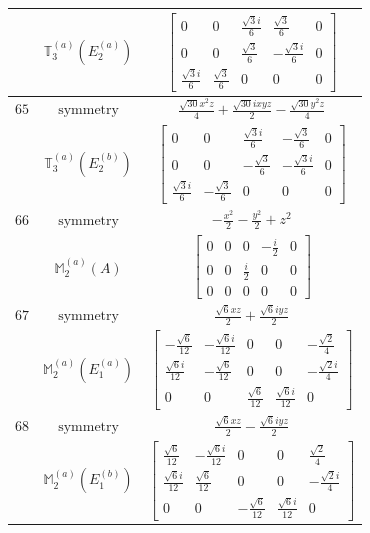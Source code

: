 \documentclass[fleqn,8pt,landscape]{jsarticle}
\begin{document}
\begin{longtable}{ccc}
$  $ & $ \mathbb{T}_{3}^{(a)}(E_{2}^{(a)}) $ & $ \begin{bmatrix} 0 & 0 & \frac{\sqrt{3} i}{6} & \frac{\sqrt{3}}{6} & 0 \\ 0 & 0 & \frac{\sqrt{3}}{6} & - \frac{\sqrt{3} i}{6} & 0 \\ \frac{\sqrt{3} i}{6} & \frac{\sqrt{3}}{6} & 0 & 0 & 0 \end{bmatrix} $ \\ \hline
$ 65 $ & $ \text{symmetry} $ & $ \frac{\sqrt{30} x^{2} z}{4} + \frac{\sqrt{30} i x y z}{2} - \frac{\sqrt{30} y^{2} z}{4} $ \\
$  $ & $ \mathbb{T}_{3}^{(a)}(E_{2}^{(b)}) $ & $ \begin{bmatrix} 0 & 0 & \frac{\sqrt{3} i}{6} & - \frac{\sqrt{3}}{6} & 0 \\ 0 & 0 & - \frac{\sqrt{3}}{6} & - \frac{\sqrt{3} i}{6} & 0 \\ \frac{\sqrt{3} i}{6} & - \frac{\sqrt{3}}{6} & 0 & 0 & 0 \end{bmatrix} $ \\ \hline
$ 66 $ & $ \text{symmetry} $ & $ - \frac{x^{2}}{2} - \frac{y^{2}}{2} + z^{2} $ \\
$  $ & $ \mathbb{M}_{2}^{(a)}(A) $ & $ \begin{bmatrix} 0 & 0 & 0 & - \frac{i}{2} & 0 \\ 0 & 0 & \frac{i}{2} & 0 & 0 \\ 0 & 0 & 0 & 0 & 0 \end{bmatrix} $ \\ \hline
$ 67 $ & $ \text{symmetry} $ & $ \frac{\sqrt{6} x z}{2} + \frac{\sqrt{6} i y z}{2} $ \\
$  $ & $ \mathbb{M}_{2}^{(a)}(E_{1}^{(a)}) $ & $ \begin{bmatrix} - \frac{\sqrt{6}}{12} & - \frac{\sqrt{6} i}{12} & 0 & 0 & - \frac{\sqrt{2}}{4} \\ \frac{\sqrt{6} i}{12} & - \frac{\sqrt{6}}{12} & 0 & 0 & - \frac{\sqrt{2} i}{4} \\ 0 & 0 & \frac{\sqrt{6}}{12} & \frac{\sqrt{6} i}{12} & 0 \end{bmatrix} $ \\ \hline
$ 68 $ & $ \text{symmetry} $ & $ \frac{\sqrt{6} x z}{2} - \frac{\sqrt{6} i y z}{2} $ \\
$  $ & $ \mathbb{M}_{2}^{(a)}(E_{1}^{(b)}) $ & $ \begin{bmatrix} \frac{\sqrt{6}}{12} & - \frac{\sqrt{6} i}{12} & 0 & 0 & \frac{\sqrt{2}}{4} \\ \frac{\sqrt{6} i}{12} & \frac{\sqrt{6}}{12} & 0 & 0 & - \frac{\sqrt{2} i}{4} \\ 0 & 0 & - \frac{\sqrt{6}}{12} & \frac{\sqrt{6} i}{12} & 0 \end{bmatrix} $ \\ \hline

\end{longtable}
\end{document}
